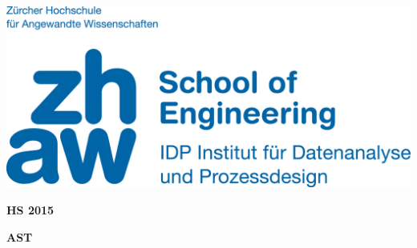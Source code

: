 \noindent
\begin{minipage}[t]{0.4\textwidth} 
\includegraphics[width=\linewidth]{logo.jpg}
\end{minipage}%
\hfill%
\begin{minipage}[t]{0.4\textwidth}\raggedleft
\textbf{\large HS 2015}
\end{minipage}

\begin{center}
 \textbf{\large AST} \\
 \vspace{0.3cm}
\end{center}
